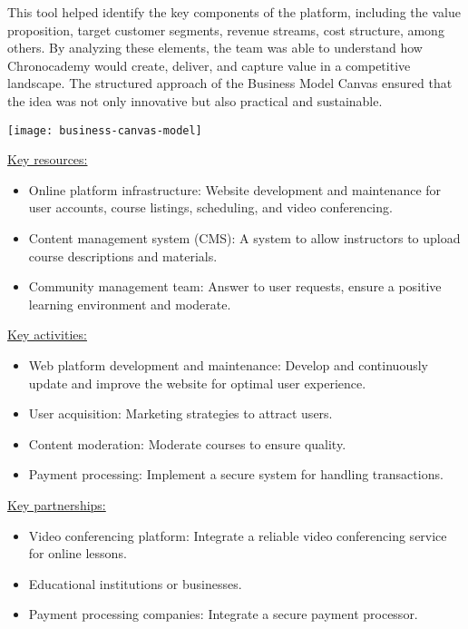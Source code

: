 This tool helped identify the key components of the platform, including the value proposition, target customer segments, revenue streams, cost structure, among others.
By analyzing these elements, the team was able to understand how Chronocademy would create, deliver, and capture value in a competitive landscape.
The structured approach of the Business Model Canvas ensured that the idea was not only innovative but also practical and sustainable.

\texttt{[image: business-canvas-model]}

\underline{Key resources:}
\begin{itemize}
    \item Online platform infrastructure: Website development and maintenance for user accounts, course listings, scheduling, and video conferencing.
    \item Content management system (CMS): A system to allow instructors to upload course descriptions and materials.
    \item Community management team: Answer to user requests, ensure a positive learning environment and moderate.
\end{itemize}

\underline{Key activities:}
\begin{itemize}
    \item Web platform development and maintenance: Develop and continuously update and improve the website for optimal user experience.
    \item User acquisition: Marketing strategies to attract users.
    \item Content moderation: Moderate courses to ensure quality.
    \item Payment processing: Implement a secure system for handling transactions.
\end{itemize}

\underline{Key partnerships:}
\begin{itemize}
    \item Video conferencing platform: Integrate a reliable video conferencing service for online lessons.
    \item Educational institutions or businesses.
    \item Payment processing companies: Integrate a secure payment processor.
\end{itemize}

